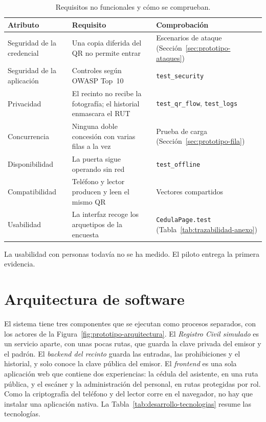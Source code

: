 \begin{table}[htbp]
  \centering
  \caption{Requisitos no funcionales y cómo se comprueban.}
  \label{tab:desarrollo-rnf}
  \small
  \begin{tabular}{p{3.2cm}p{6.0cm}p{4.2cm}}
    \toprule
    Atributo & Requisito & Comprobación \\
    \midrule
    Seguridad de la credencial & Una copia diferida del QR no permite entrar & Escenarios de ataque (Sección~\ref{sec:prototipo-ataques}) \\
    Seguridad de la aplicación & Controles según OWASP Top~10~\cite{owasp_top10_2021} & \texttt{test\_security} \\
    Privacidad & El recinto no recibe la fotografía; el historial enmascara el RUT & \texttt{test\_qr\_flow}, \texttt{test\_logs} \\
    Concurrencia & Ninguna doble concesión con varias filas a la vez & Prueba de carga (Sección~\ref{sec:prototipo-fila}) \\
    Disponibilidad & La puerta sigue operando sin red & \texttt{test\_offline} \\
    Compatibilidad & Teléfono y lector producen y leen el mismo QR & Vectores compartidos \\
    Usabilidad & La interfaz recoge los arquetipos de la encuesta & \texttt{CedulaPage.test} (Tabla~\ref{tab:trazabilidad-anexo}) \\
    \bottomrule
  \end{tabular}
\end{table}

La usabilidad con personas todavía no se ha medido. El piloto entrega la primera evidencia.

\section{Arquitectura de software}
\label{sec:desarrollo-arquitectura}

El sistema tiene tres componentes que se ejecutan como procesos separados, con los actores de la
Figura~\ref{fig:prototipo-arquitectura}. El \emph{Registro Civil simulado} es un servicio aparte, con unas pocas
rutas, que guarda la clave privada del emisor y el padrón. El \emph{backend del recinto} guarda las entradas, las
prohibiciones y el historial, y solo conoce la clave pública del emisor. El \emph{frontend} es una sola aplicación
web que contiene dos experiencias: la cédula del asistente, en una ruta pública, y el escáner y la administración
del personal, en rutas protegidas por rol. Como la criptografía del teléfono y del lector corre en el navegador,
no hay que instalar una aplicación nativa. La Tabla~\ref{tab:desarrollo-tecnologias} resume las tecnologías.

